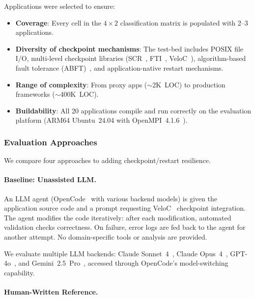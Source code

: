 Applications were selected to ensure:

\begin{itemize}
    \item \textbf{Coverage}: Every cell in the $4 \times 2$ classification matrix is populated with 2--3 applications.
    \item \textbf{Diversity of checkpoint mechanisms}: The test-bed includes POSIX file I/O, multi-level checkpoint libraries (SCR~\cite{scr}, FTI~\cite{fti}, VeloC~\cite{veloc}), algorithm-based fault tolerance (ABFT)~\cite{abft}, and application-native restart mechanisms.
    \item \textbf{Range of complexity}: From proxy apps (${\sim}$2K~LOC) to production frameworks (${\sim}$400K~LOC).
    \item \textbf{Buildability}: All 20 applications compile and run correctly on the evaluation platform (ARM64 Ubuntu~24.04 with OpenMPI~4.1.6~\cite{openmpi}).
\end{itemize}

\subsubsection{Evaluation Approaches}
\label{sec:approaches}

We compare four approaches to adding checkpoint/restart resilience.

\paragraph{Baseline: Unassisted LLM.}

An LLM agent (OpenCode~\cite{opencode} with various backend models) is given the application source code and a prompt requesting VeloC~\cite{veloc} checkpoint integration. The agent modifies the code iteratively: after each modification, automated validation checks correctness. On failure, error logs are fed back to the agent for another attempt. No domain-specific tools or analysis are provided.

We evaluate multiple LLM backends: Claude Sonnet~4~\cite{claude}, Claude Opus~4~\cite{claude}, GPT-4o~\cite{gpt4o}, and Gemini~2.5~Pro~\cite{gemini}, accessed through OpenCode's model-switching capability.

\paragraph{Human-Written Reference.}


